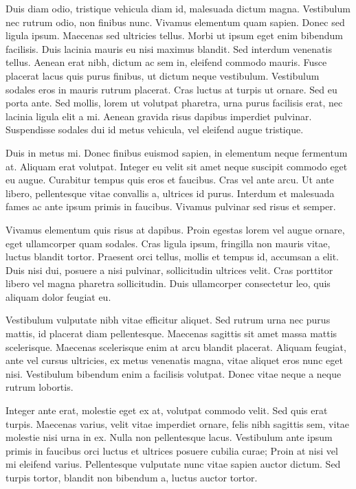 \documentclass{homework}
\begin{document}
Duis diam odio, tristique vehicula diam id, malesuada dictum magna. Vestibulum nec rutrum odio, non finibus nunc. Vivamus elementum quam sapien. Donec sed ligula ipsum. Maecenas sed ultricies tellus. Morbi ut ipsum eget enim bibendum facilisis. Duis lacinia mauris eu nisi maximus blandit. Sed interdum venenatis tellus. Aenean erat nibh, dictum ac sem in, eleifend commodo mauris. Fusce placerat lacus quis purus finibus, ut dictum neque vestibulum. Vestibulum sodales eros in mauris rutrum placerat. Cras luctus at turpis ut ornare. Sed eu porta ante. Sed mollis, lorem ut volutpat pharetra, urna purus facilisis erat, nec lacinia ligula elit a mi. Aenean gravida risus dapibus imperdiet pulvinar. Suspendisse sodales dui id metus vehicula, vel eleifend augue tristique.

Duis in metus mi. Donec finibus euismod sapien, in elementum neque fermentum at. Aliquam erat volutpat. Integer eu velit sit amet neque suscipit commodo eget eu augue. Curabitur tempus quis eros et faucibus. Cras vel ante arcu. Ut ante libero, pellentesque vitae convallis a, ultrices id purus. Interdum et malesuada fames ac ante ipsum primis in faucibus. Vivamus pulvinar sed risus et semper.

Vivamus elementum quis risus at dapibus. Proin egestas lorem vel augue ornare, eget ullamcorper quam sodales. Cras ligula ipsum, fringilla non mauris vitae, luctus blandit tortor. Praesent orci tellus, mollis et tempus id, accumsan a elit. Duis nisi dui, posuere a nisi pulvinar, sollicitudin ultrices velit. Cras porttitor libero vel magna pharetra sollicitudin. Duis ullamcorper consectetur leo, quis aliquam dolor feugiat eu.

Vestibulum vulputate nibh vitae efficitur aliquet. Sed rutrum urna nec purus mattis, id placerat diam pellentesque. Maecenas sagittis sit amet massa mattis scelerisque. Maecenas scelerisque enim at arcu blandit placerat. Aliquam feugiat, ante vel cursus ultricies, ex metus venenatis magna, vitae aliquet eros nunc eget nisi. Vestibulum bibendum enim a facilisis volutpat. Donec vitae neque a neque rutrum lobortis.

Integer ante erat, molestie eget ex at, volutpat commodo velit. Sed quis erat turpis. Maecenas varius, velit vitae imperdiet ornare, felis nibh sagittis sem, vitae molestie nisi urna in ex. Nulla non pellentesque lacus. Vestibulum ante ipsum primis in faucibus orci luctus et ultrices posuere cubilia curae; Proin at nisi vel mi eleifend varius. Pellentesque vulputate nunc vitae sapien auctor dictum. Sed turpis tortor, blandit non bibendum a, luctus auctor tortor.
\end{document}
